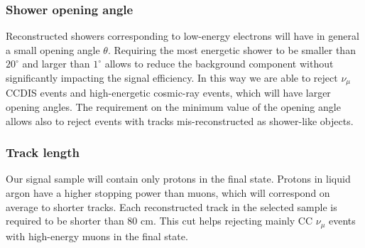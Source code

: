\subsubsection{Shower opening angle}
Reconstructed showers corresponding to low-energy electrons will have in general a small opening angle $\theta$. Requiring the most energetic shower to be smaller than $20^{\circ}$ and larger than $1^{\circ}$ allows to reduce the background component without significantly impacting the signal efficiency. In this way we are able to reject $\nu_{\mu}$ CCDIS events and high-energetic cosmic-ray events, which will have larger opening angles. The requirement on the minimum value of the opening angle allows also to reject events with tracks mis-reconstructed as shower-like objects.

\subsubsection{Track length}
Our signal sample will contain only protons in the final state. Protons in liquid argon have a higher stopping power than muons, which will correspond on average to shorter tracks. Each reconstructed track in the selected sample is required to be shorter than 80 cm. This cut helps rejecting mainly CC $\nu_{\mu}$ events with high-energy muons in the final state.



